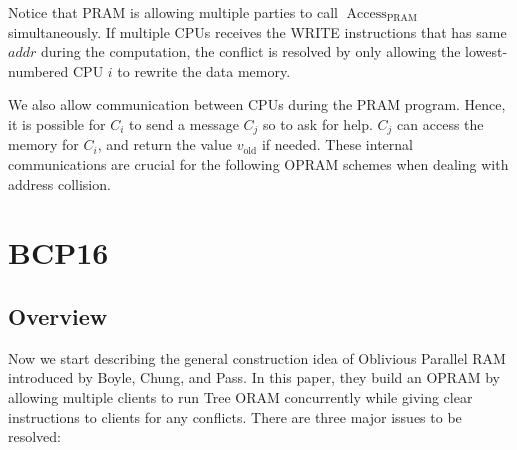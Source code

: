 \documentclass[fontsize=11pt]{article}
\begin{document}
Notice that PRAM is allowing multiple parties to call $\operatorname{Access}_{\text{PRAM}}$ simultaneously. If multiple CPUs receives the WRITE instructions that has same $addr$ during the computation, the conflict is resolved by only allowing the lowest-numbered CPU $i$ to rewrite the data memory. 

We also allow communication between CPUs during the PRAM program. Hence, it is possible for $C_i$ to send a message $C_j$ so to ask for help. $C_j$ can access the memory for $C_i$, and return the value $v_{\text{old}}$ if needed. These internal communications are crucial for the following OPRAM schemes when dealing with address collision.


\section{BCP16}
\subsection{Overview}
Now we start describing the general construction idea of Oblivious Parallel RAM introduced by Boyle, Chung, and Pass. In this paper, they build an OPRAM by allowing multiple clients to run Tree ORAM concurrently while giving clear instructions to clients for any conflicts. There are three major issues to be resolved:
\end{document}
